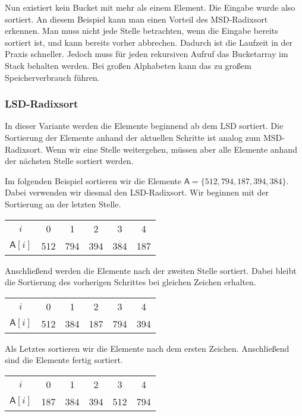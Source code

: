 Nun existiert kein Bucket mit mehr als einem Element. Die Eingabe wurde also sortiert.
An diesem Beispiel kann man einen Vorteil des MSD-Radixsort erkennen.
Man muss nicht jede Stelle betrachten, wenn die Eingabe bereits sortiert ist, und kann bereits vorher abbrechen.
Dadurch ist die Laufzeit in der Praxis schneller.
Jedoch muss für jeden rekursiven Aufruf das Bucketarray im Stack behalten werden.
Bei großen Alphabeten kann das zu großem Speicherverbrauch führen.

\subsubsection{LSD-Radixsort}
\label{sort:radix:lsd}

In dieser Variante werden die Elemente beginnend ab dem LSD sortiert.
Die Sortierung der Elemente anhand der aktuellen Schritte ist analog zum MSD-Radixsort.
Wenn wir eine Stelle weitergehen, müssen aber alle Elemente anhand der nächsten Stelle sortiert werden.

Im folgenden Beispiel sortieren wir die Elemente $\mathsf{A}=\{512, 794, 187, 394, 384\}$.
Dabei verwenden wir diesmal den LSD-Radixsort.
Wir beginnen mit der Sortierung an der letzten Stelle.

\begin{table}[H]
	\centering
	\begin{tabular}{c|| c | c c c | c }
		$i$ & 0 & 1 & 2 & 3 & 4 \\
		$\mathsf{A}[i]$ & 512 & 794 & 394 & 384 & 187
	\end{tabular}
	\label{tab:radix:lsd:step_1}
\end{table}

Anschließend werden die Elemente nach der zweiten Stelle sortiert.
Dabei bleibt die Sortierung des vorherigen Schrittes bei gleichen Zeichen erhalten.

\begin{table}[H]
	\centering
	\begin{tabular}{c|| c | c c | c c }
		$i$ & 0 & 1 & 2 & 3 & 4 \\
		$\mathsf{A}[i]$ & 512 & 384 & 187 & 794 & 394
	\end{tabular}
	\label{tab:radix:lsd:step_2}
\end{table}

Als Letztes sortieren wir die Elemente nach dem ersten Zeichen.
Anschließend sind die Elemente fertig sortiert.

\begin{table}[H]
	\centering
	\begin{tabular}{c|| c | c c | c | c }
		$i$ & 0 & 1 & 2 & 3 & 4 \\
		$\mathsf{A}[i]$ & 187 & 384 & 394 & 512 & 794
	\end{tabular}
	\label{tab:radix:lsd:step_3}
\end{table}

